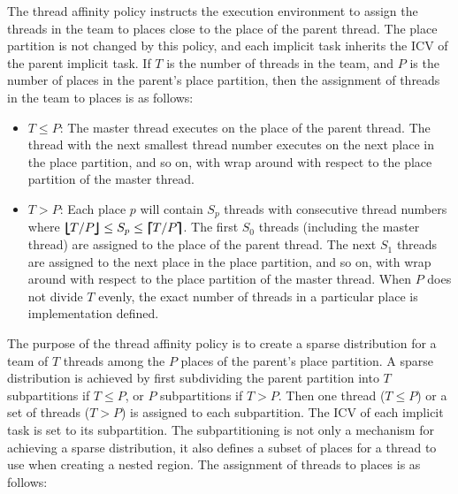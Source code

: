 The  thread affinity policy instructs the execution environment to 
assign the threads in the team to places close to the place of the parent thread. 
The place partition is not changed by this policy, and each implicit task inherits 
the  ICV of the parent implicit task. If $T$ is the number 
of threads in the team, and $P$ is the number of places in the parent's place 
partition, then the assignment of threads in the team to places is as follows:

\begin{itemize}
\item $T \leq P$: The master thread executes on the place of the parent thread. 
                  The thread with the next smallest thread number executes on 
                  the next place in the place partition, and so on, with wrap 
                  around with respect to the place partition of the master thread.
\item $T > P$: Each place $p$ will contain $S_{p}$ threads with consecutive thread
               numbers where 
               $\blfloor T/P \brfloor \leq S_{p} \leq \blceil T/P \brceil$.
               The first $S_{0}$ threads (including the master thread) are assigned to 
               the place of the parent thread. The next $S_{1}$ threads are assigned 
               to the next place in the place partition, and so on, with wrap around 
               with respect to the place partition of the master thread. When $P$ does 
               not divide $T$ evenly, the exact number of threads in a particular 
               place is implementation defined.
\end{itemize}


The purpose of the  thread affinity policy is to create a sparse 
distribution for a team of $T$ threads among the $P$ places of the parent's place 
partition. A sparse distribution is achieved by first subdividing the parent 
partition into $T$ subpartitions if $T\leq P$, or $P$ subpartitions if $T > P$. 
Then one thread ($T \leq P$) or a set of threads ($T > P$) is assigned to each 
subpartition. The  ICV of each implicit task is set 
to its subpartition. The subpartitioning is not only a mechanism for achieving 
a sparse distribution, it also defines a subset of places for a thread to use 
when creating a nested  region. The assignment of threads to 
places is as follows:

